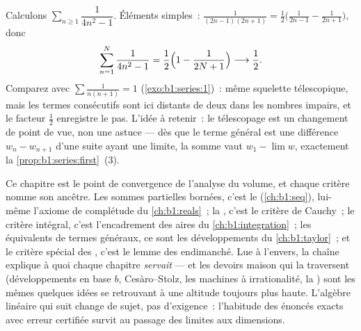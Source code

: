 \begin{example}\label{ex:b1:series:oddtelescope}
Calculons $\sum_{n \geq 1} \dfrac{1}{4n^2 - 1}$. Éléments
simples~: $\frac{1}{(2n-1)(2n+1)} =
\frac12\bigl(\frac{1}{2n-1} - \frac{1}{2n+1}\bigr)$, donc
\[
\sum_{n=1}^{N} \frac{1}{4n^2 - 1}
= \frac12\Bigl(1 - \frac{1}{2N+1}\Bigr)
\longrightarrow \frac12 .
\]
Comparez avec $\sum \frac{1}{n(n+1)} = 1$
(\cref{exo:b1:series:1})~: même squelette télescopique, mais les
termes consécutifs sont ici distants de deux dans les nombres
impairs, et le facteur $\frac12$ enregistre le pas. L'idée à
retenir~: le télescopage est un changement de point de vue, non une
astuce --- dès que le terme général est une différence $w_n -
w_{n+1}$ d'une suite ayant une limite, la somme vaut $w_1 - \lim w$,
exactement la \cref{prop:b1:series:first}~(3).
\end{example}

\begin{remark}
Ce chapitre est le point de convergence de l'analyse du volume, et
chaque critère nomme son ancêtre. Les sommes partielles bornées,
c'est le  (\cref{ch:b1:seq}), lui-même
l'axiome de complétude du \cref{ch:b1:reals}~; la ,
c'est le critère de Cauchy~; le critère intégral, c'est
l'encadrement des aires du \cref{ch:b1:integration}~; les équivalents
de termes généraux, ce sont les développements du
\cref{ch:b1:taylor}~; et le critère spécial des ,
c'est le lemme des  endimanché. Lue à l'envers, la
chaîne explique à quoi chaque chapitre \emph{servait} --- et les
devoirs maison qui la traversent (développements en base $b$,
Cesàro--Stolz, les machines à irrationalité, la )
sont les mêmes quelques idées se retrouvant à une altitude toujours
plus haute. L'algèbre linéaire qui suit change de sujet, pas
d'exigence~: l'habitude des énoncés exacts avec erreur certifiée
survit au passage des limites aux dimensions.
\end{remark}

